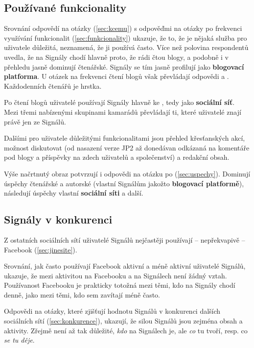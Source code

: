
\subsection{Používané funkcionality}

Srovnání odpovědí na  otázky (\ref{sec:kcemu})
s odpověďmi na otázky po frekvenci využívání funkcionalit
(\ref{sec:funkcionality}) ukazuje, že to, že je nějaká služba
pro uživatele důležitá, neznamená, že ji používá často.
Více než polovina respondentů uvedla, že
na Signály chodí hlavně proto, že rádi čtou blogy,
a podobně i v přehledu 
jasně dominují  čtenářské.
Signály se tím jasně profilují jako \textbf{blogovací platforma}.
U otázek na frekvenci čtení blogů však převládají odpovědi
 a .
Každodenních čtenářů je hrstka.

Po čtení blogů uživatelé používají Signály hlavně
ke , tedy jako \textbf{sociální síť}.
Mezi třemi nabízenými skupinami kamarádů převládají ti,
které uživatelé znají právě jen ze Signálů.

Dalšími pro uživatele důležitými funkcionalitami jsou přehled
křesťanských akcí, možnost diskutovat (od nasazení verze JP2
až donedávan odkázaná na komentáře pod blogy a příspěvky na zdech
uživatelů a společenství) a redakční obsah.

Výše načrtnutý obraz potvrzují i odpovědi na otázku
po  (\ref{sec:uspechy}).
Dominují úspěchy čtenářské a autorské (vlastní Signálům jakožto
\textbf{blogovací platformě}),
následují úspěchy vlastní \textbf{sociální síti}
a další.

\subsection{Signály v konkurenci}

Z ostatních sociálních sítí uživatelé Signálů nejčastěji používají --
nepřekvapivě -- Facebook (\ref{sec:jinesite}).

Srovnání, jak často používají Facebook aktivní a méně aktivní
uživatelé Signálů, ukazuje, že mezi aktivitou na Facebooku
a na Signálech není žádný vztah. Používanost Facebooku je prakticky
totožná mezi těmi, kdo na Signály chodí denně,
jako mezi těmi, kdo sem zavítají méně často.




Odpovědi na otázky, které zjišťují hodnotu Signálů v konkurenci
dalších sociálních sítí (\ref{sec:konkurence}),
ukazují, že silou Signálů jsou zejména obsah a aktivity.
Zřejmě není až tak důležité, \emph{kdo} na Signálech je,
ale \emph{co} tu tvoří, resp. co \emph{se tu děje}.
